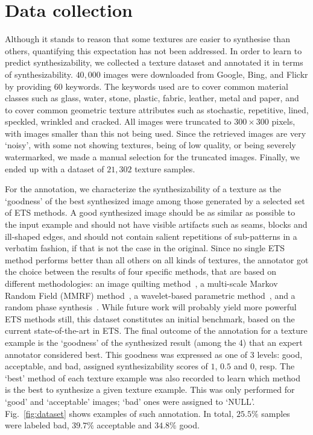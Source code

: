 \documentclass[10pt,twocolumn,letterpaper]{article}
\begin{document}

\section{Data collection}
\label{sec:data}
Although it stands to reason that some textures are easier to
synthesise than others, quantifying this expectation has not been
addressed. In order to learn to predict synthesizability, we collected
a texture dataset and annotated it in terms of
synthesizability. $40,000$ images were downloaded from Google, Bing,
and Flickr by providing $60$ keywords. The keywords used are to cover
common material classes such as glass, water, stone, plastic, fabric,
leather, metal and paper, and to cover common geometric texture
attributes such as stochastic, repetitive, lined, speckled, wrinkled
and cracked. All images were truncated to $300 \times 300$ pixels,
with images smaller than this not being used. Since the retrieved
images are very `noisy', with some not showing textures, being of low
quality, or being severely watermarked, we made a manual selection for
the truncated images. Finally, we ended up with a dataset of $21,302$
texture samples.

For the annotation, we characterize the synthesizability of a texture
as the `goodness' of the best synthesized image among those generated
by a selected set of ETS methods. A good synthesized image should be
as similar as possible to the input example and should not have
visible artifacts such as seams, blocks and ill-shaped edges, and
should not contain salient repetitions of sub-patterns in a verbatim
fashion, if that is not the case in the original. Since no single ETS
method performs better than all others on all kinds of textures, the
annotator got the choice between the results of four specific methods,
that are based on different methodologies: an image quilting
method~\cite{Efros:sig2001}, a multi-scale Markov Random Field (MMRF)
method~\cite{Zalesny05}, a wavelet-based parametric
method~\cite{Portilla:2000:IJCV}, and a random phase
synthesis~\cite{random:phase}. While future work will probably yield
more powerful ETS methods still, this dataset constitutes an initial
benchmark, based on the current state-of-the-art in ETS. The final
outcome of the annotation for a texture example is the `goodness' of
the synthesized result (among the 4) that an expert annotator
considered best. This goodness was expressed as one of 3 levels: good,
acceptable, and bad, assigned synthesizability scores of $1$, $0.5$
and $0$, resp. The `best' method of each texture example was also
recorded to learn which method is the best to synthesize a given
texture example. This was only performed for `good' and `acceptable'
images; `bad' ones were assigned to `NULL'.  Fig.~\ref{fig:dataset}
shows examples of such annotation. In total, $25.5\%$ samples were
labeled bad, $39.7\%$ acceptable and $34.8\%$ good.
\end{document}
